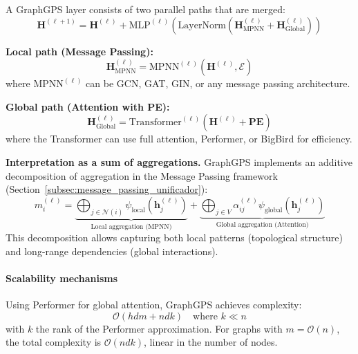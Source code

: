 \begin{definition}\label{def:graphgps_layer}
A GraphGPS layer consists of two parallel paths that are merged:
\begin{equation}
    \mathbf{H}^{(\ell+1)} = \mathbf{H}^{(\ell)} + \text{MLP}^{(\ell)}\left(\text{LayerNorm}\left(\mathbf{H}_{\text{MPNN}}^{(\ell)} + \mathbf{H}_{\text{Global}}^{(\ell)}\right)\right)
    \label{eq:graphgps_main_layer}
\end{equation}

\textbf{Local path (Message Passing):}
\begin{equation}
    \mathbf{H}_{\text{MPNN}}^{(\ell)} = \text{MPNN}^{(\ell)}\left(\mathbf{H}^{(\ell)}, \mathcal{E}\right)
    \label{eq:graphgps_mpnn_path}
\end{equation}
where $\text{MPNN}^{(\ell)}$ can be \gls{GCN}, \gls{GAT}, GIN, or any message passing architecture.

\textbf{Global path (Attention with PE):}
\begin{equation}
    \mathbf{H}_{\text{Global}}^{(\ell)} = \text{Transformer}^{(\ell)}\left(\mathbf{H}^{(\ell)} + \mathbf{PE}\right)
    \label{eq:graphgps_global_path}
\end{equation}
where the \gls{Transformer} can use full attention, Performer, or BigBird for efficiency.
\end{definition}

\textbf{Interpretation as a sum of aggregations.}\label{rem:graphgps_interpretation} GraphGPS implements an additive decomposition of aggregation in the Message Passing framework (Section~\ref{subsec:message_passing_unificador}):
\begin{equation}
    m_i^{(\ell)} = \underbrace{\bigoplus_{j \in \mathcal{N}(i)} \psi_{\text{local}}(\mathbf{h}_j^{(\ell)})}_{\text{Local aggregation (MPNN)}} + \underbrace{\bigoplus_{j \in V} \alpha_{ij}^{(\ell)} \psi_{\text{global}}(\mathbf{h}_j^{(\ell)})}_{\text{Global aggregation (Attention)}}
    \label{eq:graphgps_message_decomposition}
\end{equation}
This decomposition allows capturing both local patterns (topological structure) and long-range dependencies (global interactions).

\paragraph{Scalability mechanisms}

\begin{proposition}\label{prop:graphgps_efficient_complexity}
Using Performer for global attention, GraphGPS achieves complexity:
\begin{equation}
    \mathcal{O}(hdm + ndk) \quad \text{where } k \ll n
    \label{eq:graphgps_linear_complexity}
\end{equation}
with $k$ the rank of the Performer approximation. For graphs with $m = \mathcal{O}(n)$, the total complexity is $\mathcal{O}(ndk)$, linear in the number of nodes.
\end{proposition}


